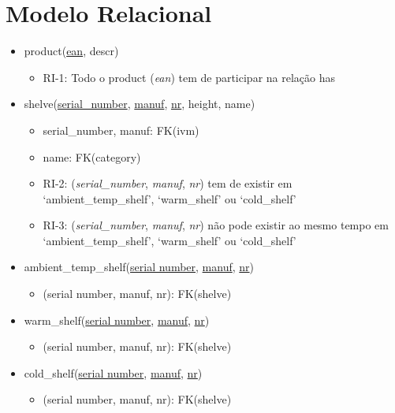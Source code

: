 \documentclass{article}
\newcommand{\bpoint}{\item[$\bullet$]}
\newenvironment{myitemize}
{ \begin{itemize}
    \setlength{\itemsep}{5pt}
    \setlength{\parskip}{0pt}
    \setlength{\parsep}{0pt}     }
{ \end{itemize}                  }
\begin{document}
	\section*{Modelo Relacional}
	\vspace{2mm}
	\begin{myitemize}

		\item[] product(\underline{ean}, descr)
		\begin{myitemize}
				\bpoint RI-1: Todo o product (\textit{ean}) tem de participar na relação has
		\end{myitemize}

		\vspace{2mm}

		\item[] shelve(\underline{serial\_number}, \underline{manuf}, \underline{nr}, height, name)
		\begin{myitemize}
			\bpoint serial\_number, manuf: FK(ivm)
			\bpoint name: FK(category)
			\bpoint RI-2: (\textit{serial\_number}, \textit{manuf}, \textit{nr}) tem de existir em `ambient\_temp\_shelf', `warm\_shelf' ou `cold\_shelf'
			\bpoint RI-3: (\textit{serial\_number}, \textit{manuf}, \textit{nr}) não pode existir ao mesmo tempo em `ambient\_temp\_shelf', `warm\_shelf' ou `cold\_shelf'
		\end{myitemize}

		\vspace{2mm}

		\item[] ambient\_temp\_shelf(\underline{serial number}, \underline{manuf}, \underline{nr})
		\begin{myitemize}
			\bpoint (serial number, manuf, nr): FK(shelve)
		\end{myitemize}

		\vspace{2mm}

		\item[] warm\_shelf(\underline{serial number}, \underline{manuf}, \underline{nr})
		\begin{myitemize}
			\bpoint (serial number, manuf, nr): FK(shelve)
		\end{myitemize}

		\vspace{2mm}

		\item[]{cold\_shelf(\underline{serial number}, \underline{manuf}, \underline{nr})}
		\begin{myitemize}
			\bpoint (serial number, manuf, nr): FK(shelve)
		\end{myitemize}


\end{myitemize}
\end{document}

